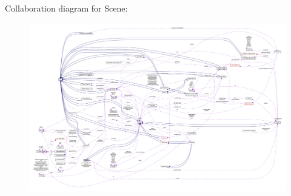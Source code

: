 Collaboration diagram for Scene\+:
\nopagebreak
\begin{figure}[H]
\begin{center}
\leavevmode
\includegraphics[width=350pt]{classScene__coll__graph}
\end{center}
\end{figure}
